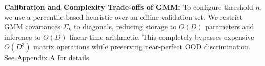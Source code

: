 \textbf{Calibration and Complexity Trade-offs of GMM:} To configure threshold $\eta$, we use a percentile-based heuristic over an offline validation set. We restrict GMM covariances $\Sigma_k$ to diagonals, reducing storage to $O(D)$ parameters and inference to $O(D)$ linear-time arithmetic. This completely bypasses expensive $O(D^3)$ matrix operations while preserving near-perfect OOD discrimination. See Appendix A for details.